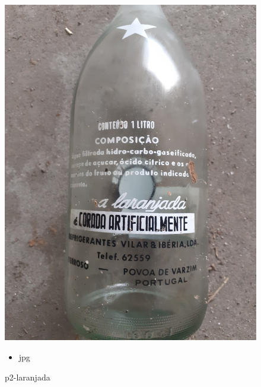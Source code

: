 \documentclass{article}
\begin{document}
		\begin{figure}[ht!]
		\begin{minipage}{0.35\textwidth}
			\centering
			\includegraphics[width=\linewidth]{p2-laranjada.jpg}
			\caption{ p2-laranjada }
		\end{minipage}
		\hspace{1cm} %
		\begin{minipage}{0.3\textwidth}
			\begin{tcolorbox}[colback=white, colframe=black, boxrule=1pt]
				\begin{itemize}
					\item jpg
                    
				\end{itemize}

			\end{tcolorbox}
		\end{minipage}
	\end{figure}
	
\end{document}
